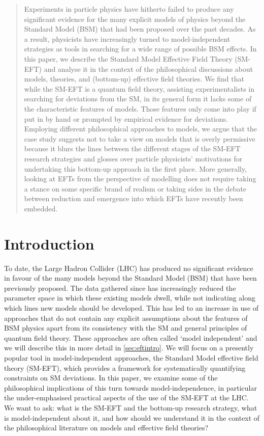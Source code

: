 
\begin{abstract}
Experiments in particle physics have hitherto failed to produce any significant evidence for the many explicit models of physics beyond the Standard Model (BSM) that had been proposed over the past decades. 
As a result, physicists have increasingly turned to model-independent strategies as tools in searching for a wide range of possible BSM effects.
In this paper, we describe the Standard Model Effective Field Theory (SM-EFT) and analyse it in the context of the philosophical discussions about models, theories, and (bottom-up) effective field theories.
We find that while the SM-EFT is a quantum field theory, assisting experimentalists in searching for deviations from the SM, in its general form it lacks some of the characteristic features of models. 
Those features only come into play if put in by hand or prompted by empirical evidence for deviations. 
Employing different philosophical approaches to models, we argue that the case study suggests not to take a view on models that is overly permissive because it blurs the lines between the different stages of the SM-EFT research strategies and glosses over particle physicists' motivations for undertaking this bottom-up approach in the first place. 
More generally, looking at EFTs from the perspective of modelling does not require taking a stance on some specific brand of realism or taking sides in the debate between reduction and emergence into which EFTs have recently been embedded.
\end{abstract}

\section{Introduction}

To date, the Large Hadron Collider (LHC) has produced no significant evidence in favour of the many models beyond the Standard Model (BSM) that have been previously proposed. 
The data gathered since has increasingly reduced the parameter space in which these existing models dwell, while not indicating along which lines new models should be developed.
This has led to an increase in use of approaches that do not contain any explicit assumptions about the features of BSM physics apart from its consistency with the SM and general principles of quantum field theory.
These approaches are often called `model independent' and we will describe this in more detail in \ref{sec:eftintro}.
We will focus on a presently popular tool in model-independent approaches, the Standard Model effective field theory (SM-EFT), which provides a framework for systematically quantifying constraints on SM deviations.
In this paper, we examine some of the philosophical implications of this turn towards model-independence, in particular the under-emphasised practical aspects of the use of the SM-EFT at the LHC.
We want to ask: what is the SM-EFT and the bottom-up research strategy, what is model-independent about it, and how should we understand it in the context of the philosophical literature on models and effective field theories?

